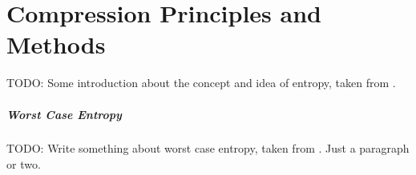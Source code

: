 
\chapter{Compression Principles and Methods} %

\label{ch:Chapter2} %

TODO: Some introduction about the concept and idea of entropy, taken from \cite{Shannon1948,navarro2016compact,han2002mathematics}.

\paragraph{Worst Case Entropy} TODO: Write something about worst case entropy, taken from \cite{navarro2016compact}. Just a paragraph or two.








